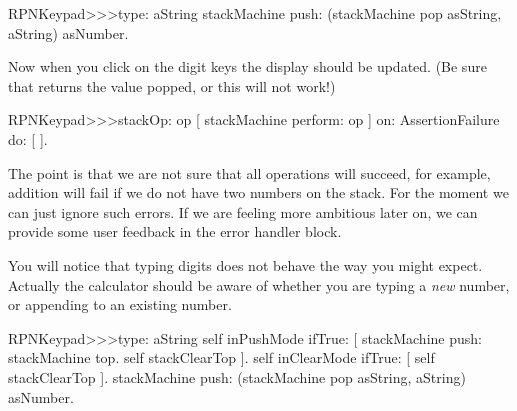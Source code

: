 \documentclass[a4paper,10pt,twoside]{book}
\begin{document}
\begin{code}{}
RPNKeypad>>>type: aString
	stackMachine push: (stackMachine pop asString, aString) asNumber.
\end{code}
Now when you click on the digit keys the display should be updated.
(Be sure that  returns the value popped, or this will not work!)



\begin{code}{}
RPNKeypad>>>stackOp: op
	[ stackMachine perform: op ] on: AssertionFailure do: [ ].
\end{code}

The point is that we are not sure that all operations will succeed, for example, addition will fail if we do not have two numbers on the stack.
For the moment we can just ignore such errors.
If we are feeling more ambitious later on, we can provide some user feedback in the error handler block.


You will notice that typing digits does not behave the way you might expect.
Actually the calculator should be aware of whether you are typing a \emph{new} number, or appending to an existing number.


\begin{code}{}
RPNKeypad>>>type: aString
	self inPushMode ifTrue: [
		stackMachine push: stackMachine top.
		self stackClearTop ].
	self inClearMode ifTrue: [ self stackClearTop ].
	stackMachine push: (stackMachine pop asString, aString) asNumber.
\end{code}
\end{document}
